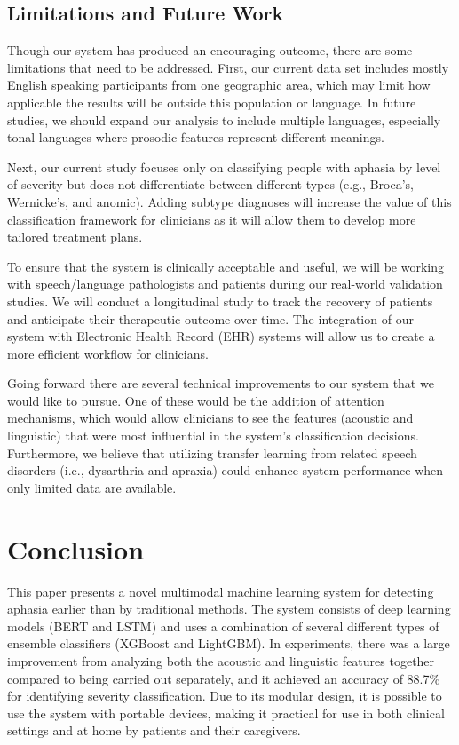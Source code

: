 \documentclass[conference]{IEEEtran}
\begin{document}
\subsection{Limitations and Future Work}

Though our system has produced an encouraging outcome, there are some limitations that need to be addressed. First, our current data set includes mostly English speaking participants from one geographic area, which may limit how applicable the results will be outside this population or language. In future studies, we should expand our analysis to include multiple languages, especially tonal languages where prosodic features represent different meanings.

Next, our current study focuses only on classifying people with aphasia by level of severity but does not differentiate between different types (e.g., Broca's, Wernicke's, and anomic). Adding subtype diagnoses will increase the value of this classification framework for clinicians as it will allow them to develop more tailored treatment plans.

To ensure that the system is clinically acceptable and useful, we will be working with speech/language pathologists and patients during our real-world validation studies. We will conduct a longitudinal study to track the recovery of patients and anticipate their therapeutic outcome over time. The integration of our system with Electronic Health Record (EHR) systems will allow us to create a more efficient workflow for clinicians.

Going forward there are several technical improvements to our system that we would like to pursue. One of these would be the addition of attention mechanisms, which would allow clinicians to see the features (acoustic and linguistic) that were most influential in the system's classification decisions. Furthermore, we believe that utilizing transfer learning from related speech disorders (i.e., dysarthria and apraxia) could enhance system performance when only limited data are available.

\section{Conclusion}

This paper presents a novel multimodal machine learning system for detecting aphasia earlier than by traditional methods. The system consists of deep learning models (BERT and LSTM) and uses a combination of several different types of ensemble classifiers (XGBoost and LightGBM). In experiments, there was a large improvement from analyzing both the acoustic and linguistic features together compared to being carried out separately, and it achieved an accuracy of 88.7\% for identifying severity classification. Due to its modular design, it is possible to use the system with portable devices, making it practical for use in both clinical settings and at home by patients and their caregivers.
\end{document}
